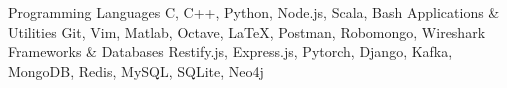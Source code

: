 \begin{cvskills}
  \cvskill
    {Programming Languages}
    {C, C++, Python, Node.js, Scala, Bash}
  \cvskill
  {Applications \& Utilities}
    {Git, Vim, Matlab, Octave, \LaTeX, Postman, Robomongo, Wireshark}
  \cvskill
    {Frameworks \& Databases}
    {Restify.js, Express.js, Pytorch, Django, Kafka, MongoDB, Redis, MySQL, SQLite, Neo4j}
\end{cvskills}

